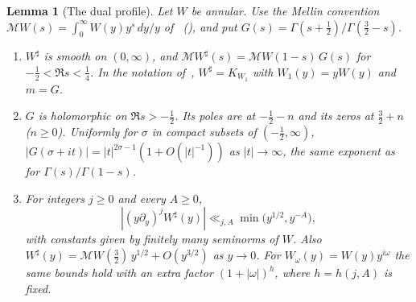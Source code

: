 \documentclass[11pt]{article}
\numberwithin{equation}{section}
\newtheorem{lemma}{Lemma}
\begin{document}
\begin{lemma}[The dual profile]\label{lem:s5-sharp}
Let $W$ be annular. Use the Mellin convention $\mathcal MW(s)=\int_0^\infty W(y)y^{s}\,dy/y$ of~\cite{OAI78}
(\cite[Lemma~4.5]{OAI78}), and put $G(s)=\Gamma(s+\frac12)/\Gamma(\frac32-s)$.
\begin{enumerate}
\item[(a)] $W^\sharp$ is smooth on $(0,\infty)$, and $\mathcal MW^\sharp(s)=\mathcal MW(1-s)\,G(s)$ for
 $-\frac12<\Re s<\frac14$. In the notation of~\cite[Lemma~4.7]{OAI78},
 $W^\sharp=K_{W_1}$ with $W_1(y)=yW(y)$ and $m=G$.
\item[(b)] $G$ is holomorphic on $\Re s>-\frac12$. Its poles are at $-\frac12-n$ and its zeros at
 $\frac32+n$ ($n\ge0$). Uniformly for $\sigma$ in compact subsets of $(-\frac12,\infty)$,
 $|G(\sigma+it)|=|t|^{2\sigma-1}(1+O(|t|^{-1}))$ as $|t|\to\infty$, the same exponent as for
 $\Gamma(s)/\Gamma(1-s)$.
\item[(c)] For integers $j\ge0$ and every $A\ge0$,
 \begin{equation}\label{eq:d181}
 |(y\partial_y)^jW^\sharp(y)|\ll_{j,A}\min\bigl(y^{1/2},y^{-A}\bigr),
 \end{equation}
 with constants given by finitely many seminorms of $W$. Also
 $W^\sharp(y)=\mathcal MW(\tfrac32)\,y^{1/2}+O(y^{3/2})$ as $y\to0$. For $W_\omega(y)=W(y)y^{i\omega}$ the
 same bounds hold with an extra factor $(1+|\omega|)^{h}$, where $h=h(j,A)$ is fixed.
\end{enumerate}
\end{lemma}
\end{document}
